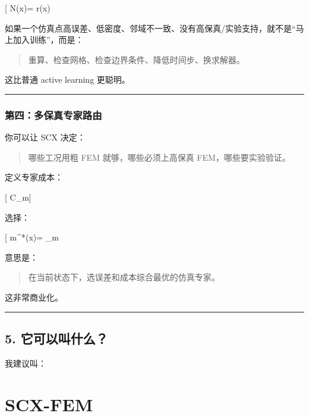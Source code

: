 \documentclass[
  12pt,
]{ctexart}
\begin{document}
{[} N(x)= r(x)\cdot {} \cdot
[1-C(s(x))]\cdot
[1-A(s(x))]{]}

如果一个仿真点高误差、低密度、邻域不一致、没有高保真/实验支持，就不是``马上加入训练''，而是：

\begin{quote}
重算、检查网格、检查边界条件、降低时间步、换求解器。
\end{quote}

这比普通 active learning 更聪明。

\begin{center}\rule{0.5\linewidth}{0.5pt}\end{center}

\subsubsection{第四：多保真专家路由}\label{ux7b2cux56dbux591aux4fddux771fux4e13ux5bb6ux8defux7531}

你可以让 SCX 决定：

\begin{quote}
哪些工况用粗 FEM 就够，哪些必须上高保真 FEM，哪些要实验验证。
\end{quote}

定义专家成本：

{[} C\_m{]}

选择：

{[} m\^{}*(x)= \arg\min\_m \left[
R_m(s(x))+\lambda C_m
\right]{]}

意思是：

\begin{quote}
在当前状态下，选误差和成本综合最优的仿真专家。
\end{quote}

这非常商业化。

\begin{center}\rule{0.5\linewidth}{0.5pt}\end{center}

\subsection{5.
它可以叫什么？}\label{ux5b83ux53efux4ee5ux53ebux4ec0ux4e48}

我建议叫：

\section{\texorpdfstring{\textbf{SCX-FEM}}{SCX-FEM}}\label{scx-fem}
\end{document}
